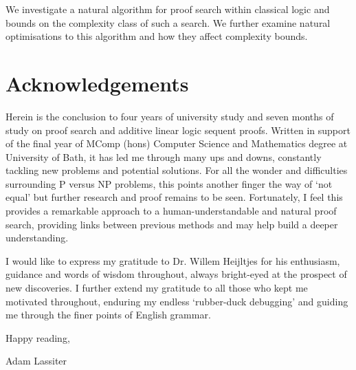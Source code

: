 


\abstract
    We investigate a natural algorithm for proof search within classical logic and bounds on the complexity class of such a search.
    We further examine natural optimisations to this algorithm and how they affect complexity bounds.
\newpage

\section*{Acknowledgements}
    Herein is the conclusion to four years of university study and seven months of study on proof search and additive linear logic sequent proofs.
    Written in support of the final year of MComp (hons) Computer Science and Mathematics degree at University of Bath, it has led me through many ups and downs, constantly tackling new problems and potential solutions.
    For all the wonder and difficulties surrounding P versus NP problems, this points another finger the way of `not equal' but further research and proof remains to be seen.
    Fortunately, I feel this provides a remarkable approach to a human-understandable and natural proof search, providing links between previous methods and may help build a deeper understanding.

    I would like to express my gratitude to Dr. Willem Heijltjes for his enthusiasm, guidance and words of wisdom throughout, always bright-eyed at the prospect of new discoveries.
    I further extend my gratitude to all those who kept me motivated throughout, enduring my endless `rubber-duck debugging' and guiding me through the finer points of English grammar.

    Happy reading,\par
    Adam Lassiter
\newpage


\tableofcontents
\newpage




